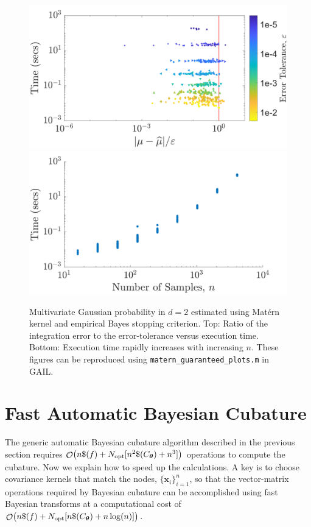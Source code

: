 \documentclass{svjour3}                     %
\DeclareMathOperator{\Order}{{\mathcal O}}
\newcommand{\bm}[1]{\boldsymbol{#1}}
\newcommand{\vtheta}{{\bm{\theta}}}
\newcommand{\vx}{\bm{x}}
\newcommand{\opt}{{\textup{opt}}}
\newcommand{\code}[1]{\texttt{#1}}
\begin{document}
\begin{figure}
	\centering
		\includegraphics[width=0.95\linewidth]{MVN_guaranteed_time_Matern_d2_2019-Jun-29}
	\centering
		\includegraphics[width=0.95\linewidth]{MVN_rapid_n_vs_time_Matern_d2_2019-Jun-29}
	\caption{Multivariate Gaussian probability in $d=2$ estimated using Mat\'ern kernel and empirical Bayes stopping criterion. Top: Ratio of the integration error to the error-tolerance versus execution time. Bottom: Execution time rapidly increases with increasing $n$. These figures can be reproduced using \code{matern\_guaranteed\_plots.m} in GAIL.}
	\label{fig:MVN_Metern_d2b2}
\end{figure}

\section{Fast Automatic Bayesian Cubature}\label{sec:fast_BC}

The generic automatic Bayesian cubature algorithm described in the previous section requires $\Order\bigl(n \$(f) +  N_{\opt} [n^2 \$(C_\vtheta) + n^3]\bigr)$ operations to compute the cubature. Now we explain how to speed up the calculations. A key is to choose covariance kernels that match the nodes, $\{\vx_i\}_{i=1}^n$, so that the vector-matrix operations required by Bayesian cubature can be accomplished using fast Bayesian transforms at a computational cost of $\Order\bigl(n \$(f) + N_{\opt} [n \$(C_\vtheta)  + n \log(n)] \bigr)$.
\end{document}
